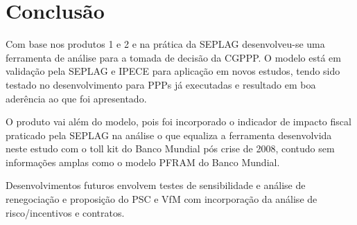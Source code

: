 \section{Conclusão}
\label{sec:conclusao}

Com base nos produtos 1 e 2 e na prática da SEPLAG desenvolveu-se uma ferramenta de análise para a tomada de decisão da CGPPP. O modelo está em validação pela SEPLAG e IPECE para aplicação em novos estudos, tendo sido testado no desenvolvimento para PPPs já executadas e resultado em boa aderência ao que foi apresentado.

O produto vai além do modelo, pois foi incorporado o indicador de impacto fiscal praticado pela SEPLAG na análise o que equaliza a ferramenta desenvolvida neste estudo com o toll kit do Banco Mundial pós crise de 2008, contudo sem informações amplas como o modelo PFRAM do Banco Mundial.

Desenvolvimentos futuros envolvem testes de sensibilidade e análise de renegociação e proposição do PSC e VfM com incorporação da análise de risco/incentivos e contratos.